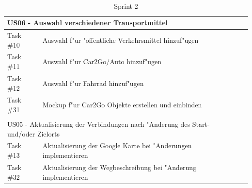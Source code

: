 \documentclass[a4paper, 11pt]{scrreprt}
\begin{document}
\begin{table}[H]

\caption{Sprint 2}

\ \\

\par

\label{tab:Sprint 2}

\centering

\begin{tabular}{|p{2.5cm} p{12cm}| ll}

\hline
\multicolumn{2}{|l|}{US06 - Auswahl verschiedener Transportmittel}\\

\hline
Task \#10 & Auswahl f"ur "offentliche Verkehrsmittel hinzuf"ugen\\

\hline
Task \#11 & Auswahl f"ur Car2Go/Auto hinzuf"ugen\\

\hline
Task \#12 & Auswahl f"ur Fahrrad hinzuf"ugen\\

\hline
Task \#31 & Mockup f"ur Car2Go Objekte erstellen und einbinden\\



\hline
\multicolumn{2}{l}{}\\

\hline
\multicolumn{2}{|l|}{US05 - Aktualisierung der Verbindungen nach "Anderung des Start- und/oder Zielorts}\\

\hline
Task \#13 & Aktualisierung der Google Karte bei "Anderungen implementieren\\

\hline
Task \#32 & Aktualisierung der Wegbeschreibung bei "Anderung implementieren\\

\hline

\end{tabular}

\end{table}
\end{document}
